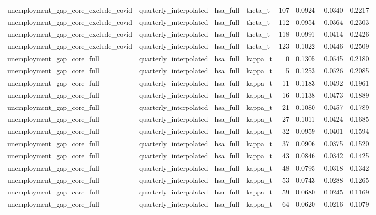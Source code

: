 \begin{tabular}{llllrrrr}
unemployment\_gap\_core\_exclude\_covid & quarterly\_interpolated & hsa\_full & theta\_t & 107 & 0.0924 & -0.0340 & 0.2217 \\
unemployment\_gap\_core\_exclude\_covid & quarterly\_interpolated & hsa\_full & theta\_t & 112 & 0.0954 & -0.0364 & 0.2303 \\
unemployment\_gap\_core\_exclude\_covid & quarterly\_interpolated & hsa\_full & theta\_t & 118 & 0.0991 & -0.0414 & 0.2426 \\
unemployment\_gap\_core\_exclude\_covid & quarterly\_interpolated & hsa\_full & theta\_t & 123 & 0.1022 & -0.0446 & 0.2509 \\
unemployment\_gap\_core\_full & quarterly\_interpolated & hsa\_full & kappa\_t & 0 & 0.1305 & 0.0545 & 0.2180 \\
unemployment\_gap\_core\_full & quarterly\_interpolated & hsa\_full & kappa\_t & 5 & 0.1253 & 0.0526 & 0.2085 \\
unemployment\_gap\_core\_full & quarterly\_interpolated & hsa\_full & kappa\_t & 11 & 0.1183 & 0.0492 & 0.1961 \\
unemployment\_gap\_core\_full & quarterly\_interpolated & hsa\_full & kappa\_t & 16 & 0.1138 & 0.0473 & 0.1889 \\
unemployment\_gap\_core\_full & quarterly\_interpolated & hsa\_full & kappa\_t & 21 & 0.1080 & 0.0457 & 0.1789 \\
unemployment\_gap\_core\_full & quarterly\_interpolated & hsa\_full & kappa\_t & 27 & 0.1011 & 0.0424 & 0.1685 \\
unemployment\_gap\_core\_full & quarterly\_interpolated & hsa\_full & kappa\_t & 32 & 0.0959 & 0.0401 & 0.1594 \\
unemployment\_gap\_core\_full & quarterly\_interpolated & hsa\_full & kappa\_t & 37 & 0.0906 & 0.0375 & 0.1520 \\
unemployment\_gap\_core\_full & quarterly\_interpolated & hsa\_full & kappa\_t & 43 & 0.0846 & 0.0342 & 0.1425 \\
unemployment\_gap\_core\_full & quarterly\_interpolated & hsa\_full & kappa\_t & 48 & 0.0795 & 0.0318 & 0.1342 \\
unemployment\_gap\_core\_full & quarterly\_interpolated & hsa\_full & kappa\_t & 53 & 0.0743 & 0.0288 & 0.1265 \\
unemployment\_gap\_core\_full & quarterly\_interpolated & hsa\_full & kappa\_t & 59 & 0.0680 & 0.0245 & 0.1169 \\
unemployment\_gap\_core\_full & quarterly\_interpolated & hsa\_full & kappa\_t & 64 & 0.0620 & 0.0216 & 0.1079 \\

\end{tabular}
